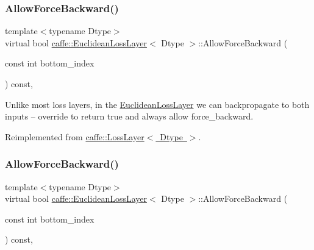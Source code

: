 \subsubsection{\texorpdfstring{Allow\+Force\+Backward()}{AllowForceBackward()}\hspace{0.1cm}{\footnotesize\ttfamily [1/2]}}
{\footnotesize\ttfamily template$<$typename Dtype$>$ \\
virtual bool \mbox{\hyperlink{classcaffe_1_1_euclidean_loss_layer}{caffe\+::\+Euclidean\+Loss\+Layer}}$<$ Dtype $>$\+::Allow\+Force\+Backward (\begin{DoxyParamCaption}\item[{const int}]{bottom\+\_\+index }\end{DoxyParamCaption}) const\hspace{0.3cm}{\ttfamily [inline]}, {\ttfamily [virtual]}}

Unlike most loss layers, in the \mbox{\hyperlink{classcaffe_1_1_euclidean_loss_layer}{Euclidean\+Loss\+Layer}} we can backpropagate to both inputs -- override to return true and always allow force\+\_\+backward. 

Reimplemented from \mbox{\hyperlink{classcaffe_1_1_loss_layer_a36d35155bfe0de53a79c517f33759612}{caffe\+::\+Loss\+Layer$<$ Dtype $>$}}.

\mbox{\label{classcaffe_1_1_euclidean_loss_layer_a76dd3fde9f09cb9840f05ee035b5a2c5}} 
\subsubsection{\texorpdfstring{Allow\+Force\+Backward()}{AllowForceBackward()}\hspace{0.1cm}{\footnotesize\ttfamily [2/2]}}
{\footnotesize\ttfamily template$<$typename Dtype$>$ \\
virtual bool \mbox{\hyperlink{classcaffe_1_1_euclidean_loss_layer}{caffe\+::\+Euclidean\+Loss\+Layer}}$<$ Dtype $>$\+::Allow\+Force\+Backward (\begin{DoxyParamCaption}\item[{const int}]{bottom\+\_\+index }\end{DoxyParamCaption}) const\hspace{0.3cm}{\ttfamily [inline]}, {\ttfamily [virtual]}}

